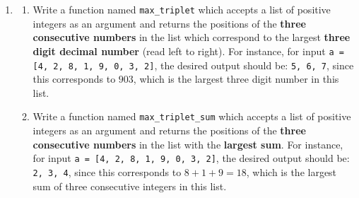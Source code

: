 \documentclass[a4paper, 11pt]{article}
\theoremstyle{definition}
\begin{document}
\begin{enumerate}[label = E\arabic*.]
\begin{enumerate}
			For instance, with \texttt{a = [4, 2, 1, 6, 5, 2]} as an input, \texttt{max\_three} should return: \texttt{4, 5, 6} (regardless of their order).
			\item Modify \texttt{max\_three} to accept a dictionary as an input, with strings as keys and integers as values, and return the three keys with the largest values (handling ties appropriately). Name your function \texttt{max\_three\_dict}.
			
			For instance, with \texttt{a = \{`a':4, `b':5, `c':-2, `d':7, `e':3\}} as input, it should return: \texttt{`a', 
			`b', `d'}.
			\item Modify \texttt{max\_three} to accept two arguments:
			\begin{itemize}
				\item a list of integers, and;
				\item a positive integer, $n$.
			\end{itemize}
			Now, your function should return the largest $n$ elements from the given list, handling ties an any exceptions appropriately (e.g., the list should have at least $n$ elements, to begin with). Name you function \texttt{max\_n}.
			\item Modify \texttt{max\_n} to accept a dictionary and a positive integer, $n$, as arguments, in the spirit of E2(b). That is, given a dictionary with strings as keys and integers as values, \texttt{max\_n} should return the keys corresponding to the $n$ largest values in the dictionary. Name your function \texttt{max\_n\_dict}.
			\item In all the above, use \texttt{foo} from E1 as well as \texttt{bar} from E2 to help you test your functions.
		\end{enumerate}
		\item \begin{enumerate}
			\item Write a function named \texttt{max\_triplet} which accepts a list of positive integers as an argument and returns the positions of the \textbf{three consecutive numbers} in the list which correspond to the largest \textbf{three digit decimal number} (read left to right). For instance, for input \texttt{a = [4, 2, 8, 1, 9, 0, 3, 2]}, the desired output should be: \texttt{5, 6, 7}, since this corresponds to $903$, which is the largest three digit number in this list.
			\item Write a function named \texttt{max\_triplet\_sum} which accepts a list of positive integers as an argument and returns the positions of the \textbf{three consecutive numbers} in the list with the \textbf{largest sum}. For instance, for input \texttt{a = [4, 2, 8, 1, 9, 0, 3, 2]}, the desired output should be: \texttt{2, 3, 4}, since this corresponds to $8+1+9=18$, which is the largest sum of three consecutive integers in this list.

\end{enumerate}
\end{enumerate}
\end{document}
